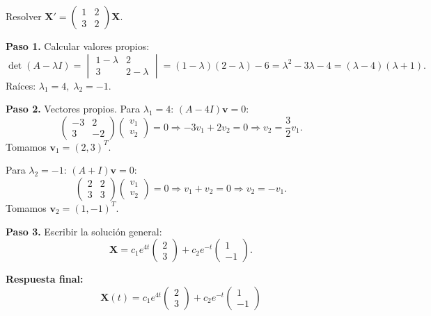 \begin{example}
Resolver $\mathbf{X}'=
\begin{pmatrix}
1&2\\
3&2
\end{pmatrix}\mathbf{X}$.
\begin{myproof}
\textbf{Paso 1.} Calcular valores propios:
\[
\det(A-\lambda I)=
\begin{vmatrix}
1-\lambda&2\\
3&2-\lambda
\end{vmatrix}
=(1-\lambda)(2-\lambda)-6=\lambda^2-3\lambda-4=(\lambda-4)(\lambda+1).
\]
Raíces: $\lambda_1=4,\; \lambda_2=-1$.

\textbf{Paso 2.} Vectores propios.
Para $\lambda_1=4$: $(A-4I)\mathbf{v}=0$:
\[
\begin{pmatrix}
-3&2\\
3&-2
\end{pmatrix}
\begin{pmatrix}
v_1\\v_2
\end{pmatrix}=0
\Rightarrow -3v_1+2v_2=0\Rightarrow v_2=\frac32 v_1.
\]
Tomamos $\mathbf{v}_1=(2,3)^T$.

Para $\lambda_2=-1$: $(A+I)\mathbf{v}=0$:
\[
\begin{pmatrix}
2&2\\
3&3
\end{pmatrix}
\begin{pmatrix}
v_1\\v_2
\end{pmatrix}=0
\Rightarrow v_1+v_2=0\Rightarrow v_2=-v_1.
\]
Tomamos $\mathbf{v}_2=(1,-1)^T$.

\textbf{Paso 3.} Escribir la solución general:
\[
\mathbf{X}=c_1 e^{4t}\begin{pmatrix}2\\3\end{pmatrix}+c_2 e^{-t}\begin{pmatrix}1\\-1\end{pmatrix}.
\]

\textbf{Respuesta final:}
\[
\boxed{
\mathbf{X}(t)=c_1 e^{4t}
\begin{pmatrix}
2\\3
\end{pmatrix}
+c_2 e^{-t}
\begin{pmatrix}
1\\-1
\end{pmatrix}
}
\]
\end{myproof}
\end{example}


